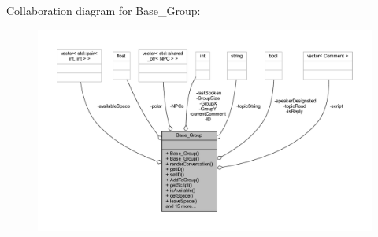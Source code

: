 Collaboration diagram for Base\+\_\+\+Group\+:\nopagebreak
\begin{figure}[H]
\begin{center}
\leavevmode
\includegraphics[width=350pt]{class_base___group__coll__graph}
\end{center}
\end{figure}
